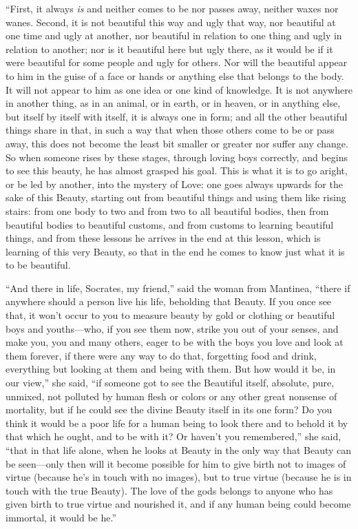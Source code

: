 “First, it always {\em is} and neither comes to be nor passes away,
neither waxes nor wanes. Second, it is not beautiful this way and ugly
that way, nor beautiful at one time and ugly at another, nor beautiful
in relation to one thing and ugly in relation to another; nor is it
beautiful here but ugly there, as it would be if it were beautiful for
some people and ugly for others. Nor will the beautiful appear to him in
the guise of a face or hands or anything else that belongs to the body.
It will not appear to him as one idea or one kind of knowledge. It is
not anywhere in another thing, as in  an animal, or in earth, or
in heaven, or in anything else, but itself by itself with itself, it is
always one in form; and all the other beautiful things share in that, in
such a way that when those others come to be or pass away, this does not
become the least bit smaller or greater nor suffer any change. So when
someone rises by these stages, through loving boys correctly, and begins
to see this beauty, he has almost grasped his goal. This is what it
 is to go aright, or be led by another, into the mystery of Love:
one goes always upwards for the sake of this Beauty, starting out from
beautiful things and using them like rising stairs: from one body to two
and from two to all beautiful bodies, then from beautiful bodies to
beautiful customs, and from customs to learning beautiful things, and
from these lessons he
arrives in the end at
this lesson, which is learning of this very Beauty, so that in the end
he comes to know just what it is to be beautiful. 

“And there in life, Socrates, my friend,” said the woman from Mantinea,
“there if anywhere should a person live his life, beholding that Beauty.
If you once see that, it won’t occur to you to measure beauty by gold or
clothing or beautiful boys and youths---who, if you see them now, strike
you out of your senses, and make you, you and many others, eager to be
with the boys you love and look at them forever, if there were any way
to do that, forgetting food and drink, everything but looking at them
and  being with them. But how would it be, in our view,” she
said, “if someone got to see the Beautiful itself, absolute, pure,
unmixed, not polluted by human flesh or colors or any other great
nonsense of mortality, but if he  could see the divine
Beauty itself in its one form? Do you think it would be a poor life for
a human being to look there and to behold it by that which he ought, and
to be with it? Or haven’t you remembered,” she said, “that in that life
alone, when he looks at Beauty in the only way that Beauty can be
seen---only then will it become possible for him to give birth not to
images of virtue (because he’s in touch with no images), but to true
virtue (because he is in touch with the true Beauty). The love of the
gods belongs to anyone who has given birth to true virtue and nourished
it,  and if any human being could become immortal, it would be
he.”


